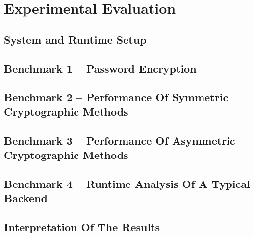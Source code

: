\chapter{Experimental Evaluation}

\section{System and Runtime Setup}

\section{Benchmark 1 -- Password Encryption}

\section{Benchmark 2 -- Performance Of Symmetric Cryptographic Methods}

\section{Benchmark 3 -- Performance Of Asymmetric Cryptographic Methods}

\section{Benchmark 4 -- Runtime Analysis Of A Typical Backend}

\section{Interpretation Of The Results}